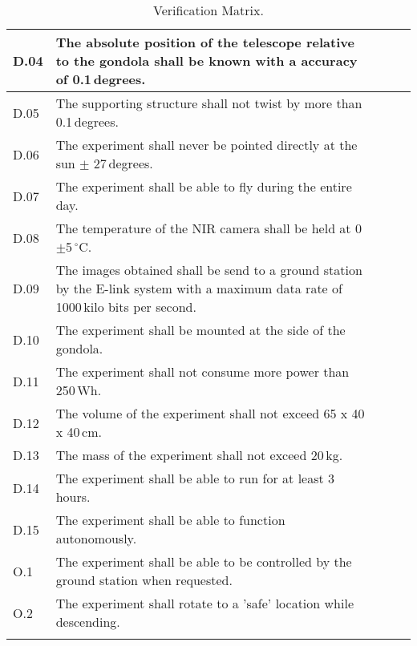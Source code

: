\begin{longtable}[]{|m{}| m{} |m{} |m{}|m{}|}
D.04 & The absolute position of the telescope relative to the gondola shall be known with a accuracy of 0.1\,degrees.
& & & \\\hline

D.05 & The supporting structure shall not twist by more than 0.1\,degrees.
& & & \\\hline

D.06 & The experiment shall never be pointed directly at the sun $\pm$ 27\,degrees.
& & & \\\hline

D.07 & The experiment shall be able to fly during the entire day.
& & & \\\hline

D.08 & The temperature of the NIR camera shall be held at 0\,$\pm$5\,$^\circ$C.
& & & \\\hline

D.09 & The images obtained shall be send to a ground station by the E-link system with a maximum data rate of 1000\,kilo bits per second.
& & & \\\hline

D.10 & The experiment shall be mounted at the side of the gondola.
& & & \\\hline

D.11 & The experiment shall not consume more power than 250\,Wh.
& & & \\\hline

D.12 & The volume of the experiment shall not exceed 65 x 40 x 40\,cm.
& & & \\\hline

D.13 & The mass of the experiment shall not exceed 20\,kg.
& & & \\\hline

D.14 & The experiment shall be able to run for at least 3\,hours.
& & & \\\hline

D.15 & The experiment shall be able to function autonomously.
& & & \\\hline

O.1 & The experiment shall be able to be controlled by the ground station when requested.
& & & \\\hline

O.2 & The experiment shall rotate to a 'safe' location while descending.
& & & \\\hline

\caption{Verification Matrix.}
\label{tab:var-mat}
\end{longtable}
\raggedbottom